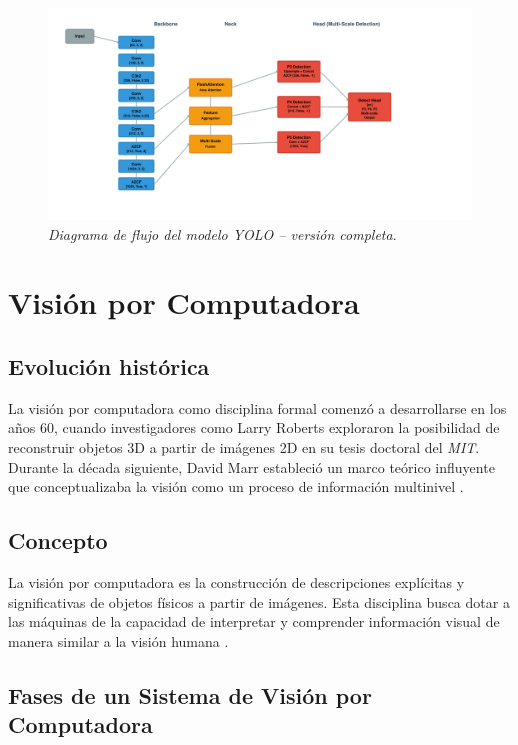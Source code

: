 {\begin{figure}[H]
\leavevmode
\begin{minipage}{\textwidth}
\begin{center}
\includegraphics[width=1.2\textwidth]{./capitulo_02/figures/yolo12}
\caption{\textit{Diagrama de flujo del modelo YOLO – versión completa}. \label{fig:yolo12}}
\end{center}
\end{minipage}
\end{figure}

\section{Visión por Computadora}
\subsection{Evolución histórica}
La visión por computadora como disciplina formal comenzó a desarrollarse en los años 60, cuando investigadores como Larry Roberts exploraron la posibilidad de reconstruir objetos 3D a partir de imágenes 2D en su tesis doctoral del \textit{MIT}. Durante la década siguiente, David Marr estableció un marco teórico influyente que conceptualizaba la visión como un proceso de información multinivel \cite{szeliski2022}.

\subsection{Concepto}
La visión por computadora es la construcción de descripciones explícitas y significativas de objetos físicos a partir de imágenes. Esta disciplina busca dotar a las máquinas de la capacidad de interpretar y comprender información visual de manera similar a la visión humana \cite{forsyth2021}.

\subsection{Fases de un Sistema de Visión por Computadora}

}
